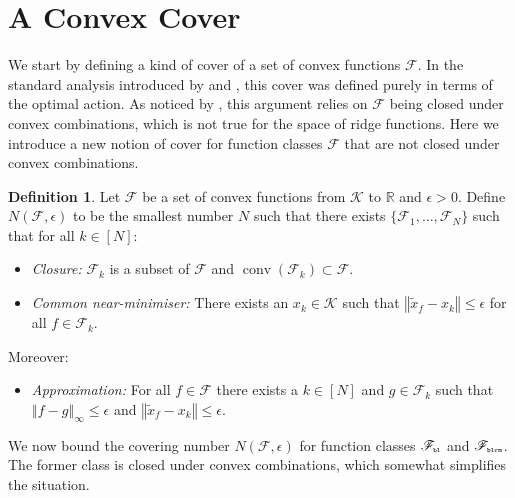 \documentclass[letter, 12pt]{report}
\newcommand{\pr}{\text{\tiny\texttt{r}}}
\newcommand{\pb}{\text{\tiny\texttt{b}}}
\newcommand{\pl}{\text{\tiny\texttt{l}}}
\renewcommand{\pm}{\text{\tiny\texttt{m}}}
\newcommand{\R}{\mathbb R}
\newcommand{\norm}[1]{\left \Vert  #1 \right \Vert}
\newcommand{\cK}{\mathcal K}
\newcommand{\sF}{\mathscr F}
\newcommand{\conv}{\operatorname{conv}}
\newcommand{\1}{\mathbf{1}}
\theoremstyle{plain}
\theoremstyle{definition}
\newtheorem{definition}[theorem]{Definition}
\theoremstyle{remark}
\begin{document}
\section{A Convex Cover}\label{sec:cover}
We start by defining a kind of cover of a set of convex functions $\sF$.
In the standard analysis introduced by \cite{BDKP15} and \cite{BE18}, this cover was defined purely in terms of the optimal action.
As noticed by \cite{lattimore2021minimax}, this argument relies on $\sF$ being closed under convex combinations, which is not true
for the space of ridge functions. Here we introduce a new notion of cover for function classes $\sF$ that are not closed
under convex combinations.
\begin{definition}\label{def:cover}
    Let $\sF$ be a set of convex functions from $\cK$ to $\R$ and $\epsilon > 0$.
    Define $N(\sF, \epsilon)$ to be the smallest number $N$ such that there exists $\{\sF_1,\ldots,\sF_N\}$ such that for all $k \in [N]$:
    \begin{itemize}
        \item \textit{Closure:} $\sF_k$ is a subset of $\sF$ and $\conv(\sF_k) \subset \sF$.
        \item \textit{Common near-minimiser:} There exists an $x_k \in \cK$ such that $\norm{\tilde x_f - x_k} \leq \epsilon$ for all $f \in \sF_k$.
    \end{itemize}
    Moreover:
    \begin{itemize}
        \item \textit{Approximation:} For all $f \in \sF$ there exists a $k \in [N]$ and $g \in \sF_k$ such that $\norm{f - g}_\infty \leq \epsilon$
              and $\norm{\tilde x_f - x_k} \leq \epsilon$.
    \end{itemize}
\end{definition}
We now bound the covering number $N(\sF, \epsilon)$ for function classes $\sF_{\pb\pl}$ and $\sF_{\pb\pl\pr\pm}$.
The former class is closed under convex combinations, which somewhat simplifies the situation.
\end{document}
